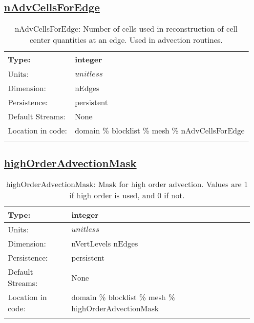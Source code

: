 \subsection[nAdvCellsForEdge]{\hyperref[sec:var_tab_mesh]{nAdvCellsForEdge}}
\label{subsec:var_sec_mesh_nAdvCellsForEdge}
\begin{center}
\begin{longtable}{| p{2.0in} | p{4.0in} |}
        \hline 
        Type: & integer \\
        \hline 
        Units: & $unitless$ \\
        \hline 
        Dimension: & nEdges \\
        \hline 
        Persistence: & persistent \\
        \hline 
		 Default Streams: & None \\
        \hline 
		 Location in code: & domain \% blocklist \% mesh \% nAdvCellsForEdge \\
		 \hline 
    \caption{nAdvCellsForEdge: Number of cells used in reconstruction of cell center quantities at an edge. Used in advection routines.}
\end{longtable}
\end{center}
\subsection[highOrderAdvectionMask]{\hyperref[sec:var_tab_mesh]{highOrderAdvectionMask}}
\label{subsec:var_sec_mesh_highOrderAdvectionMask}
\begin{center}
\begin{longtable}{| p{2.0in} | p{4.0in} |}
        \hline 
        Type: & integer \\
        \hline 
        Units: & $unitless$ \\
        \hline 
        Dimension: & nVertLevels nEdges \\
        \hline 
        Persistence: & persistent \\
        \hline 
		 Default Streams: & None \\
        \hline 
		 Location in code: & domain \% blocklist \% mesh \% highOrderAdvectionMask \\
		 \hline 
    \caption{highOrderAdvectionMask: Mask for high order advection. Values are 1 if high order is used, and 0 if not.}
\end{longtable}
\end{center}
